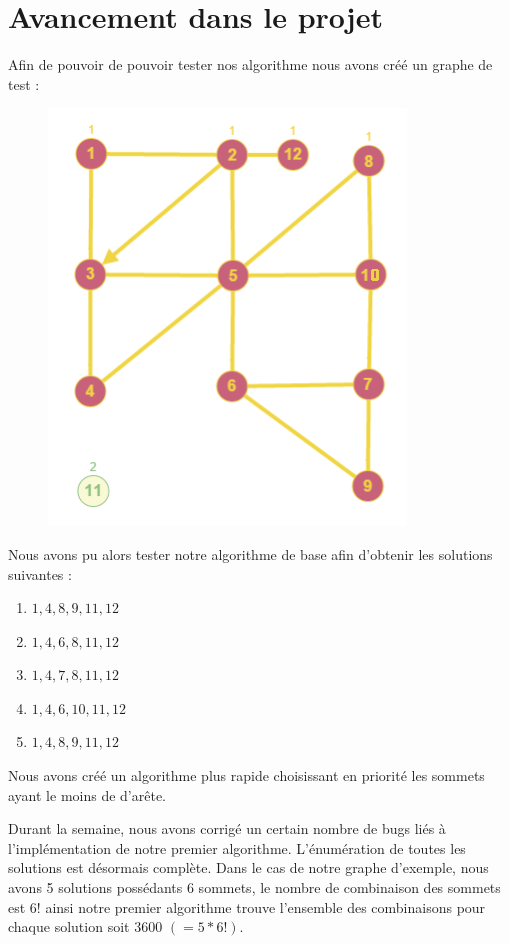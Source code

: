 \documentclass[10pt,a4paper]{article}
\begin{document}
\section{Avancement dans le projet}

Afin de pouvoir de pouvoir tester nos algorithme nous avons créé un graphe de test :

\begin{figure}[h]
 \hspace{-4cm}
\includegraphics[scale=1]{exemplegraphe.png}
\end{figure} 

Nous avons pu alors tester notre algorithme de base afin d'obtenir les solutions suivantes :

\begin{enumerate}
\item ${1, 4, 8, 9, 11, 12}$
\item ${1, 4, 6, 8, 11, 12 }$
\item ${1, 4, 7, 8, 11, 12 }$
\item ${1, 4, 6, 10, 11, 12 }$
\item ${1, 4, 8, 9, 11, 12 }$
\end{enumerate}

Nous avons créé un algorithme plus rapide choisissant en priorité les sommets ayant le moins de d'arête.

Durant la semaine, nous avons corrigé un certain nombre de bugs liés à l'implémentation de notre premier algorithme.
L'énumération de toutes les solutions est désormais complète. Dans le cas de notre graphe d'exemple, nous avons 5 solutions possédants 6 sommets, le nombre de combinaison des sommets est $6!$ ainsi notre premier algorithme trouve l'ensemble des combinaisons pour chaque solution soit 3600 $(=5*6!)$.
\end{document}
